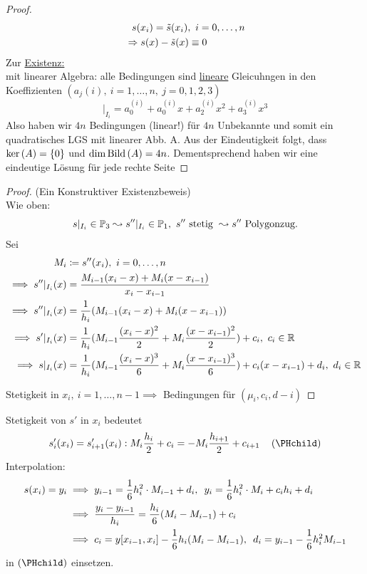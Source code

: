 \documentclass[../Skript.tex]{subfiles}
\begin{document}
\begin{proof}
\begin{align*}
        &\ \ s(x_i)=\Tilde{s}(x_i),\ i=0,\dots,n \\
        &\Rightarrow s(x)-\Tilde{s}(x)\equiv 0
    \end{align*} 
    Zur \underline{Existenz:}\\
    mit linearer Algebra: alle Bedingungen sind \underline{lineare} Gleicuhngen in den Koeffizienten $(a_j{(i)},
    \ i=1,\dots,n, \ j=0,1,2,3)$\[
        \vert_{I_i}= a_0^{(i)} + a_{0}^{(i)}x + a_{2}^{(i)}x^2 + a_3^{(i)}x^3
    \]
    Also haben wir $4n$ Bedingungen (linear!) für $4n$ Unbekannte und somit ein quadratisches LGS mit linearer Abb. A.
    Aus der Eindeutigkeit folgt, dass $\operatorname{ker}\left(A\right) = \left\{ 0 \right\}$ und $\dim\operatorname{Bild}\left(A\right) = 4n$. Dementsprechend haben wir eine 
    eindeutige Lösung für jede rechte Seite 
\end{proof}

\begin{proof} (Ein Konstruktiver Existenzbeweis)\hfill\\
Wie oben: \[
s\vert_{I_i}\in\mathbb{P}_3 \leadsto s''\vert_{I_i}\in\mathbb{P}_1,\ s'' \text{ stetig }\leadsto s''\text{ Polygonzug}.
\]
Sei 
\begin{align*}
    M_i&\coloneqq s''(x_i),\ i=0,\dots, n \\
    \implies s''\vert_{I_i}(x)&=\frac{M_{i-1}(x_i-x)+M_{i}(x-x_{i-1})}{x_i-x_{i-1}}\\
    \implies s''\vert_{I_i}(x)&=\dfrac{1}{h_i}(M_{i-1}(x_i-x)+M_{i}(x-x_{i-1}))\\
    \implies s'\vert_{I_i}(x)&= \frac{1}{h_i}(M_{i-1}\frac{(x_i-x)^2}{2}+M_{i}\frac{(x-x_{i-1})^2}{2}) + c_i , \ c_i\in\R \\
    \implies s\vert_{I_i}(x) &= \frac{1}{h_i}(M_{i-1}\frac{(x_i-x)^3}{6}+M_{i}\frac{(x-x_{i-1})^3}{6}) +c_i(x-x_{i-1})+d_i, \ 
    d_i\in\R
\end{align*}

Stetigkeit in \(x_i,\ i=1,\dots,n-1 \implies \) Bedingungen für \((\mu_i, c_i, d-i)\) 

\end{proof}

Stetigkeit von $s'$ in $x_i$ bedeutet\[
    s_i'(x_i) = s_{i+1}'(x_i) : M_i \frac{h_i}{2} + c_i = -M_i\frac{h_{i+1}}{2} + c_{i+1}\largespace \left(\text{\PHchild}
    \right)\]
    Interpolation: \begin{align*}
        s(x_i) = y_i &\implies y_{i-1} = \frac{1}{6}h_i^2\cdot M_{i-1}+ d_i, 
        \hspace{.5em} y_i = \frac{1}{6}h_i^2\cdot M_i+c_ih_i+d_i\\
        &\implies \frac{y_i-y_{i-1}}{h_i} = \frac{h_i}{6}(M_i - M_{i-1}) + c_i\\
        &\implies c_i = y[x_{i-1}, x_i] - \frac{1}{6}h_i(M_i- M_{i-1}), \hspace{.5em} d_i = y_{i-1}-\frac{1}{6}h_i^2M_{i-1}
    \end{align*}
    in $\left(\text{\PHchild}\right)$ einsetzen.
\end{document}
